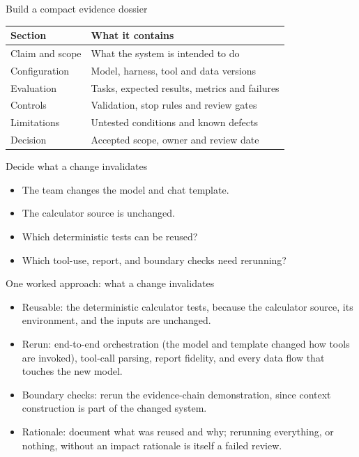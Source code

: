 \documentclass[aspectratio=169,11pt]{beamer}
\begin{document}
\begin{frame}[t,fragile]{Build a compact evidence dossier}
\fontsize{10.5}{12.5}\selectfont\setlength{\tabcolsep}{4pt}\renewcommand{\arraystretch}{1.15}
\begin{tabular}{>{\raggedright\arraybackslash}p{}>{\raggedright\arraybackslash}p{}}
\toprule
\textbf{Section} & \textbf{What it contains} \\ \midrule
Claim and scope & What the system is intended to do \\[2pt]
Configuration & Model, harness, tool and data versions \\[2pt]
Evaluation & Tasks, expected results, metrics and failures \\[2pt]
Controls & Validation, stop rules and review gates \\[2pt]
Limitations & Untested conditions and known defects \\[2pt]
Decision & Accepted scope, owner and review date \\[2pt]
\bottomrule\end{tabular}\par\vspace{2mm}
\end{frame}
\begin{frame}[t,fragile]{Decide what a change invalidates}
\fontsize{11.5}{14}\selectfont
\begin{itemize}\setlength{\itemsep}{2mm}
\item The team changes the model and chat template.
\item The calculator source is unchanged.
\item Which deterministic tests can be reused?
\item Which tool-use, report, and boundary checks need rerunning?
\end{itemize}
\end{frame}
\begin{frame}[t,fragile]{One worked approach: what a change invalidates}
\fontsize{11.5}{14}\selectfont
\begin{itemize}\setlength{\itemsep}{2mm}
\item Reusable: the deterministic calculator tests, because the calculator source, its environment, and the inputs are unchanged.
\item Rerun: end-to-end orchestration (the model and template changed how tools are invoked), tool-call parsing, report fidelity, and every data flow that touches the new model.
\item Boundary checks: rerun the evidence-chain demonstration, since context construction is part of the changed system.
\item Rationale: document what was reused and why; rerunning everything, or nothing, without an impact rationale is itself a failed review.
\end{itemize}
\end{frame}
\end{document}
